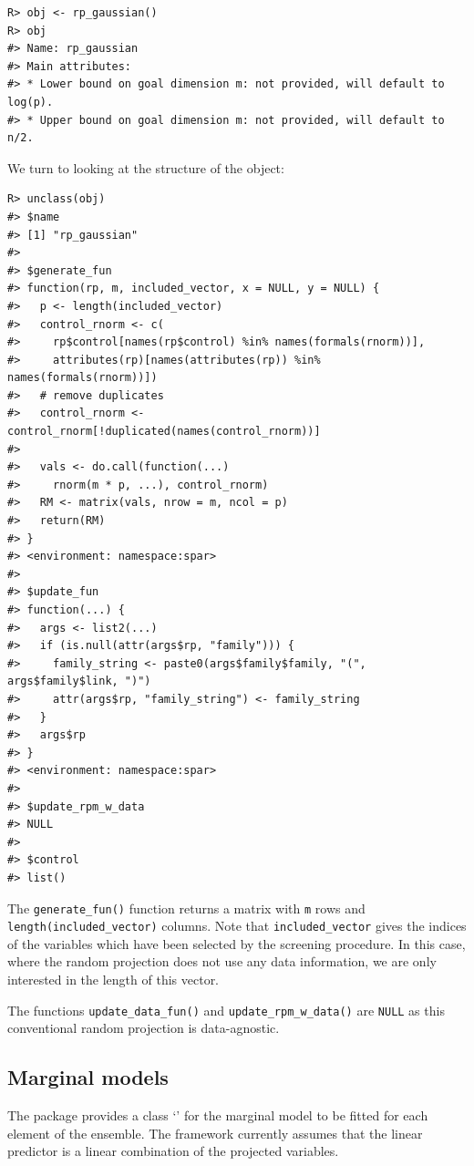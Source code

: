 \documentclass[
  article,
  nojss]{jss}
\newcommand{\class}[1]{`\code{#1}'}
\begin{document}
\begin{verbatim}
R> obj <- rp_gaussian()
R> obj
#> Name: rp_gaussian 
#> Main attributes: 
#> * Lower bound on goal dimension m: not provided, will default to log(p). 
#> * Upper bound on goal dimension m: not provided, will default to n/2.
\end{verbatim}

We turn to looking at the structure of the object:

\begin{verbatim}
R> unclass(obj)
#> $name
#> [1] "rp_gaussian"
#> 
#> $generate_fun
#> function(rp, m, included_vector, x = NULL, y = NULL) {
#>   p <- length(included_vector)
#>   control_rnorm <- c(
#>     rp$control[names(rp$control) %in% names(formals(rnorm))],
#>     attributes(rp)[names(attributes(rp)) %in% names(formals(rnorm))])
#>   # remove duplicates
#>   control_rnorm <-  control_rnorm[!duplicated(names(control_rnorm))]
#> 
#>   vals <- do.call(function(...)
#>     rnorm(m * p, ...), control_rnorm)
#>   RM <- matrix(vals, nrow = m, ncol = p)
#>   return(RM)
#> }
#> <environment: namespace:spar>
#> 
#> $update_fun
#> function(...) {
#>   args <- list2(...)
#>   if (is.null(attr(args$rp, "family"))) {
#>     family_string <- paste0(args$family$family, "(", args$family$link, ")")
#>     attr(args$rp, "family_string") <- family_string
#>   }
#>   args$rp
#> }
#> <environment: namespace:spar>
#> 
#> $update_rpm_w_data
#> NULL
#> 
#> $control
#> list()
\end{verbatim}

The \texttt{generate\_fun()} function returns a matrix with \texttt{m}
rows and \texttt{length(included\_vector)} columns. Note that
\texttt{included\_vector} gives the indices of the variables which have
been selected by the screening procedure. In this case, where the random
projection does not use any data information, we are only interested in
the length of this vector.

The functions \texttt{update\_data\_fun()} and
\texttt{update\_rpm\_w\_data()} are \texttt{NULL} as this conventional
random projection is data-agnostic.

\subsection{Marginal models}\label{marginal-models}

The package provides a class \class{sparmodel} for the marginal model to
be fitted for each element of the ensemble. The framework currently
assumes that the linear predictor is a linear combination of the
projected variables.
\end{document}
